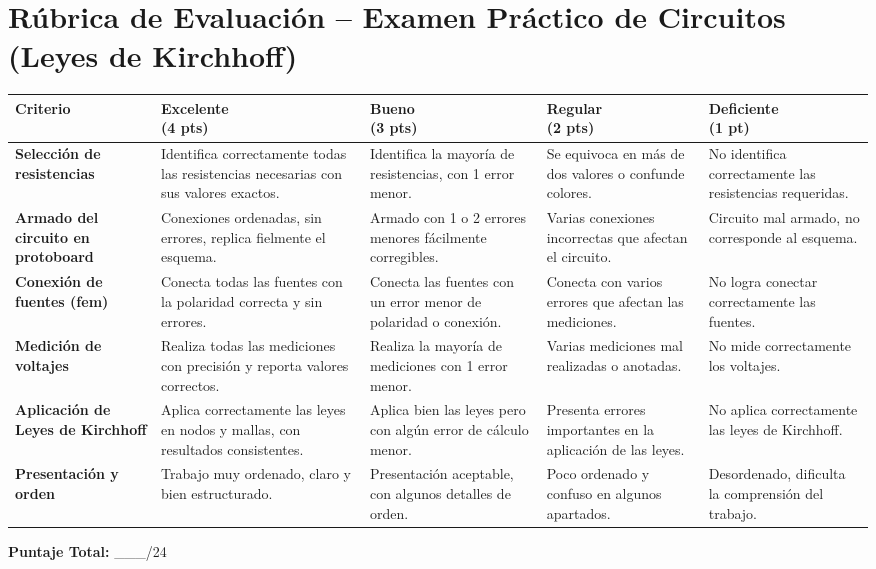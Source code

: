 \documentclass[12pt]{article}
\begin{document}
\section*{Rúbrica de Evaluación – Examen Práctico de Circuitos (Leyes de Kirchhoff)}

\renewcommand{\arraystretch}{1.5}
\begin{tabular}{|p{4cm}|p{3cm}|p{3cm}|p{3cm}|p{3cm}|}
\hline
\textbf{Criterio} & \textbf{Excelente \\ (4 pts)} & \textbf{Bueno \\ (3 pts)} & \textbf{Regular \\ (2 pts)} & \textbf{Deficiente \\ (1 pt)} \\
\hline
\textbf{Selección de resistencias} & Identifica correctamente todas las resistencias necesarias con sus valores exactos. & Identifica la mayoría de resistencias, con 1 error menor. & Se equivoca en más de dos valores o confunde colores. & No identifica correctamente las resistencias requeridas. \\
\hline
\textbf{Armado del circuito en protoboard} & Conexiones ordenadas, sin errores, replica fielmente el esquema. & Armado con 1 o 2 errores menores fácilmente corregibles. & Varias conexiones incorrectas que afectan el circuito. & Circuito mal armado, no corresponde al esquema. \\
\hline
\textbf{Conexión de fuentes (fem)} & Conecta todas las fuentes con la polaridad correcta y sin errores. & Conecta las fuentes con un error menor de polaridad o conexión. & Conecta con varios errores que afectan las mediciones. & No logra conectar correctamente las fuentes. \\
\hline
\textbf{Medición de voltajes} & Realiza todas las mediciones con precisión y reporta valores correctos. & Realiza la mayoría de mediciones con 1 error menor. & Varias mediciones mal realizadas o anotadas. & No mide correctamente los voltajes. \\
\hline
\textbf{Aplicación de Leyes de Kirchhoff} & Aplica correctamente las leyes en nodos y mallas, con resultados consistentes. & Aplica bien las leyes pero con algún error de cálculo menor. & Presenta errores importantes en la aplicación de las leyes. & No aplica correctamente las leyes de Kirchhoff. \\
\hline
\textbf{Presentación y orden} & Trabajo muy ordenado, claro y bien estructurado. & Presentación aceptable, con algunos detalles de orden. & Poco ordenado y confuso en algunos apartados. & Desordenado, dificulta la comprensión del trabajo. \\
\hline
\end{tabular}

\vspace{0.5cm}
\textbf{Puntaje Total:} \_\_\_/24
\end{document}
